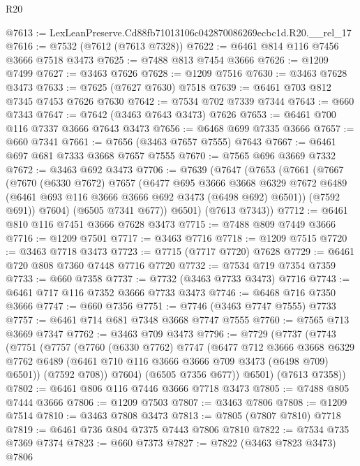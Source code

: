 \begin{lexlean}{R20}
\begin{coremodule}
@7613 := LexLeanPreserve.Cd88fb71013106c042870086269ecbc1d.R20.__rel_17
@7616 := @7532 (@7612 (@7613 @7328))
@7622 := @6461 @814 @116 @7456 @3666 @7518 @3473
@7625 := @7488 @813 @7454 @3666
@7626 := @1209 @7499
@7627 := @3463 @7626
@7628 := @1209 @7516
@7630 := @3463 @7628 @3473
@7633 := @7625 (@7627 @7630) @7518
@7639 := @6461 @703 @812 @7345 @7453 @7626 @7630
@7642 := @7534 @702 @7339 @7344
@7643 := @660 @7343
@7647 := @7642 (@3463 @7643 @3473) @7626
@7653 := @6461 @700 @116 @7337 @3666 @7643 @3473
@7656 := @6468 @699 @7335 @3666
@7657 := @660 @7341
@7661 := @7656 (@3463 @7657 @7555) @7643
@7667 := @6461 @697 @681 @7333 @3668 @7657 @7555
@7670 := @7565 @696 @3669 @7332
@7672 := @3463 @692 @3473
@7706 := @7639
    (@7647
      (@7653
        (@7661
          (@7667
            (@7670
              (@6330 @7672)
              @7657
              (@6477
                @695
                @3666
                @3668
                @6329
                @7672
                @6489
                (@6461 @693 @116 @3666 @3666 @692 @3473 (@6498 @692) @6501))
              (@7592 @691))
            @7604)
          (@6505 @7341 @677))
        @6501)
      (@7613 @7343))
@7712 := @6461 @810 @116 @7451 @3666 @7628 @3473
@7715 := @7488 @809 @7449 @3666
@7716 := @1209 @7501
@7717 := @3463 @7716
@7718 := @1209 @7515
@7720 := @3463 @7718 @3473
@7723 := @7715 (@7717 @7720) @7628
@7729 := @6461 @720 @808 @7360 @7448 @7716 @7720
@7732 := @7534 @719 @7354 @7359
@7733 := @660 @7358
@7737 := @7732 (@3463 @7733 @3473) @7716
@7743 := @6461 @717 @116 @7352 @3666 @7733 @3473
@7746 := @6468 @716 @7350 @3666
@7747 := @660 @7356
@7751 := @7746 (@3463 @7747 @7555) @7733
@7757 := @6461 @714 @681 @7348 @3668 @7747 @7555
@7760 := @7565 @713 @3669 @7347
@7762 := @3463 @709 @3473
@7796 := @7729
    (@7737
      (@7743
        (@7751
          (@7757
            (@7760
              (@6330 @7762)
              @7747
              (@6477
                @712
                @3666
                @3668
                @6329
                @7762
                @6489
                (@6461 @710 @116 @3666 @3666 @709 @3473 (@6498 @709) @6501))
              (@7592 @708))
            @7604)
          (@6505 @7356 @677))
        @6501)
      (@7613 @7358))
@7802 := @6461 @806 @116 @7446 @3666 @7718 @3473
@7805 := @7488 @805 @7444 @3666
@7806 := @1209 @7503
@7807 := @3463 @7806
@7808 := @1209 @7514
@7810 := @3463 @7808 @3473
@7813 := @7805 (@7807 @7810) @7718
@7819 := @6461 @736 @804 @7375 @7443 @7806 @7810
@7822 := @7534 @735 @7369 @7374
@7823 := @660 @7373
@7827 := @7822 (@3463 @7823 @3473) @7806

\end{coremodule}
\end{lexlean}
